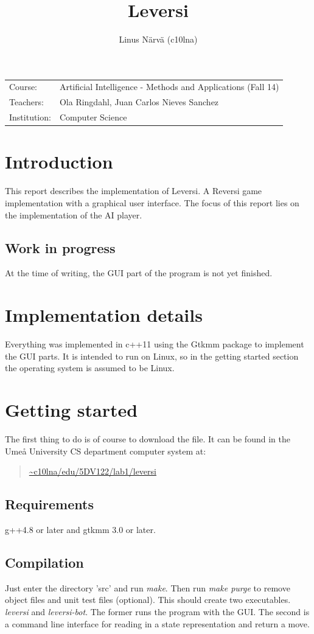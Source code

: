 \documentclass[a4paper,11pt]{article}
\title{Leversi}
\author{Linus Närvä (c10lna)}
\begin{document}
\maketitle

\begin{tabular}{l l}
Course: & Artificial Intelligence - Methods and Applications (Fall 14) \\
Teachers: & Ola Ringdahl, Juan Carlos Nieves Sanchez \\
Institution: & Computer Science \\
\end{tabular}

\section{Introduction}
This report describes the implementation of Leversi. A Reversi game implementation with a graphical user interface. The focus of this report lies on the implementation of the AI player.

\subsection{Work in progress}
At the time of writing, the GUI part of the program is not yet finished.

\section{Implementation details}
Everything was implemented in c++11 using the Gtkmm package to implement the GUI parts. It is intended to run on Linux, so in the getting started section the operating system is assumed to be Linux.

\section{Getting started}
The first thing to do is of course to download the file. It can be found in the Umeå University CS department computer system at:
\begin{quotation}
\url{~c10lna/edu/5DV122/lab1/leversi}
\end{quotation}

\subsection{Requirements}
g++4.8 or later and gtkmm 3.0 or later.

\subsection{Compilation}
Just enter the directory 'src' and run \textit{make}. Then run \textit{make purge} to remove object files and unit test files (optional). This should create two executables. \textit{leversi} and \textit{leversi-bot}. The former runs the program with the GUI. The second is a command line interface for reading in a state representation and return a move.
\end{document}
